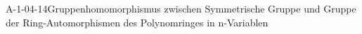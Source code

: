 
\begin{LEM}{A-1-04-14}{Gruppenhomomorphismus zwischen Symmetrische Gruppe und Gruppe der Ring-Automorphismen des Polynomringes in n-Variablen}
\end{LEM}

